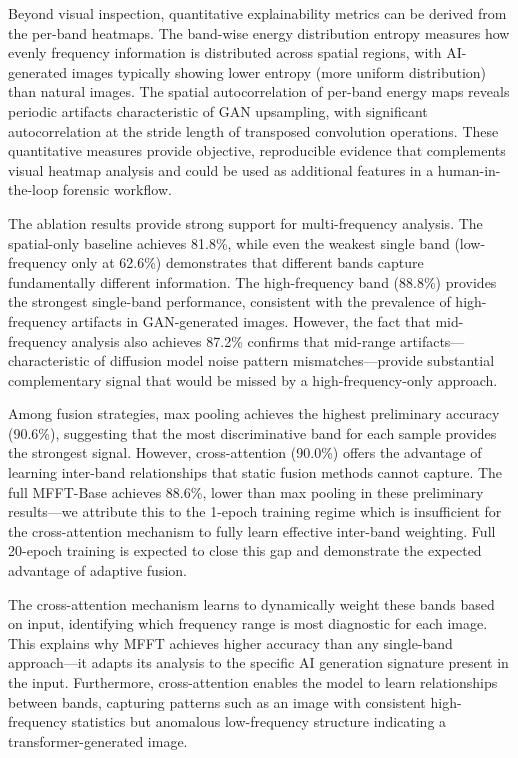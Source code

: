 \documentclass[journal]{IEEEtran}
\begin{document}
Beyond visual inspection, quantitative explainability metrics can be derived from the per-band heatmaps. The band-wise energy distribution entropy measures how evenly frequency information is distributed across spatial regions, with AI-generated images typically showing lower entropy (more uniform distribution) than natural images. The spatial autocorrelation of per-band energy maps reveals periodic artifacts characteristic of GAN upsampling, with significant autocorrelation at the stride length of transposed convolution operations. These quantitative measures provide objective, reproducible evidence that complements visual heatmap analysis and could be used as additional features in a human-in-the-loop forensic workflow.

The ablation results provide strong support for multi-frequency analysis. The spatial-only baseline achieves 81.8\%, while even the weakest single band (low-frequency only at 62.6\%) demonstrates that different bands capture fundamentally different information. The high-frequency band (88.8\%) provides the strongest single-band performance, consistent with the prevalence of high-frequency artifacts in GAN-generated images. However, the fact that mid-frequency analysis also achieves 87.2\% confirms that mid-range artifacts---characteristic of diffusion model noise pattern mismatches---provide substantial complementary signal that would be missed by a high-frequency-only approach.

Among fusion strategies, max pooling achieves the highest preliminary accuracy (90.6\%), suggesting that the most discriminative band for each sample provides the strongest signal. However, cross-attention (90.0\%) offers the advantage of learning inter-band relationships that static fusion methods cannot capture. The full MFFT-Base achieves 88.6\%, lower than max pooling in these preliminary results---we attribute this to the 1-epoch training regime which is insufficient for the cross-attention mechanism to fully learn effective inter-band weighting. Full 20-epoch training is expected to close this gap and demonstrate the expected advantage of adaptive fusion.

The cross-attention mechanism learns to dynamically weight these bands based on input, identifying which frequency range is most diagnostic for each image. This explains why MFFT achieves higher accuracy than any single-band approach---it adapts its analysis to the specific AI generation signature present in the input. Furthermore, cross-attention enables the model to learn relationships between bands, capturing patterns such as an image with consistent high-frequency statistics but anomalous low-frequency structure indicating a transformer-generated image.
\end{document}
